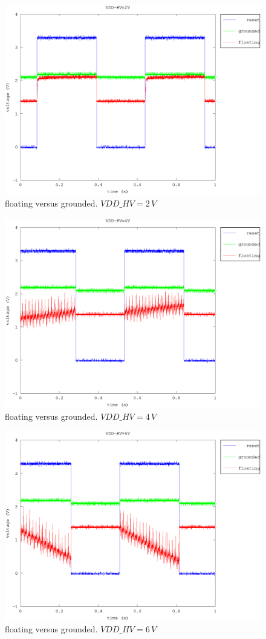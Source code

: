 \documentclass{article}
\begin{document}
\begin{figure}[H]
	\centering
	\includegraphics[width=0.8\linewidth]{fig/g_f_2V.eps}
	\caption{floating versus grounded. $VDD\_HV=2\,V$}
	\label{fig:g_f_2V}
\end{figure}

\begin{figure}[H]
	\centering
	\includegraphics[width=0.8\linewidth]{fig/g_f_4V.eps}
	\caption{floating versus grounded. $VDD\_HV=4\,V$}
	\label{fig:g_f_4V}
\end{figure}

\begin{figure}[H]
	\centering
	\includegraphics[width=0.8\linewidth]{fig/g_f_6V.eps}
	\caption{floating versus grounded. $VDD\_HV=6\,V$}
	\label{fig:g_f_6V}
\end{figure}
\end{document}

